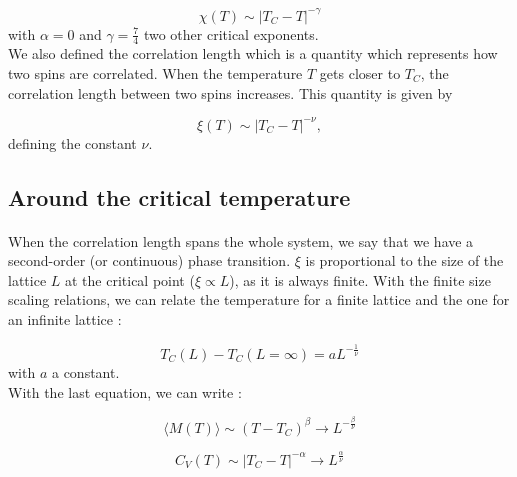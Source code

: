 \documentclass[a4paper, twoside, 11pt]{report}
\theoremstyle{theorem}
\theoremstyle{remark}
\theoremstyle{exemple}
\begin{document}
                \begin{equation*}
                    \chi(T) \sim |T_C - T |^{-\gamma}
                \end{equation*}
            with $\alpha = 0$ and $\gamma=\frac{7}{4}$ two other critical exponents.\\
            We also defined the correlation length which is a quantity which represents how two spins are correlated. When the temperature $T$ gets closer to $T_C$, the correlation length between two spins increases. This quantity is given by 
            
                \begin{equation*}
                    \xi (T) \sim |T_C - T |^{-\nu},
                \end{equation*}
            defining the constant $\nu$.
            
        \subsection{Around the critical temperature}            
            
            \paragraph{}When the correlation length spans the whole system, we say that we have a second-order (or continuous) phase transition. $\xi$ is proportional to the size of the lattice $L$ at the critical point ($\xi \propto L$), as it is always finite. With the finite size scaling relations, we can relate the temperature for a finite lattice and the one for an infinite lattice :
            
                \begin{equation*}
                    T_C(L) - T_C (L=\infty) = aL^{-\frac{1}{\nu}}
                \end{equation*}
            with $a$ a constant.\\
            With the last equation, we can write :
            
                \begin{equation*}
                    \langle M(T) \rangle \sim (T-T_C)^{\beta} \rightarrow L^{-\frac{\beta}{\nu}}
                \end{equation*}
                
                \begin{equation*}
                    C_V(T) \sim |T_C -T|^{-\alpha} \rightarrow L^{\frac{\alpha}{\nu}}
                \end{equation*}
                
\end{document}
